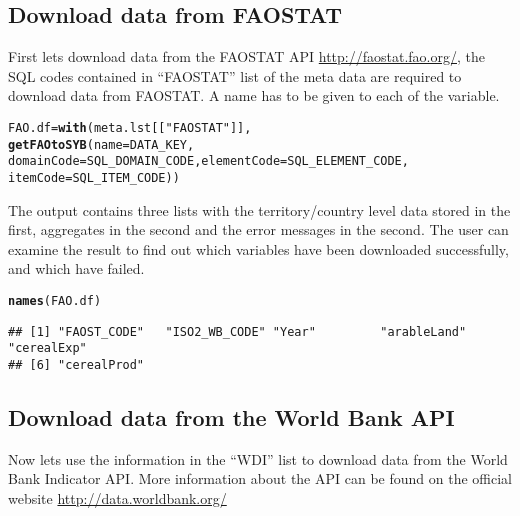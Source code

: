 \documentclass{article}\usepackage{graphicx, color}
\makeatletter
\newcommand{\hlfunctioncall}[1]{\textcolor[rgb]{0.501960784313725,0,0.329411764705882}{\textbf{#1}}}%
\newcommand{\hlstring}[1]{\textcolor[rgb]{0.6,0.6,1}{#1}}%
\newenvironment{kframe}{%
 \def\at@end@of@kframe{}%
 \ifinner\ifhmode%
  \def\at@end@of@kframe{\end{minipage}}%
  \begin{minipage}{\columnwidth}%
 \fi\fi%
 \def\FrameCommand##1{\hskip\@totalleftmargin \hskip-\fboxsep
 \colorbox{shadecolor}{##1}\hskip-\fboxsep
     \hskip-\linewidth \hskip-\@totalleftmargin \hskip\columnwidth}%
 \MakeFramed {\advance\hsize-\width
   \@totalleftmargin\z@ \linewidth\hsize
   \@setminipage}}%
 {\par\unskip\endMakeFramed%
 \at@end@of@kframe}
\newenvironment{knitrout}{}{} %
\makeatother
\begin{document}
\subsection{Download data from FAOSTAT}
First lets download data from the FAOSTAT API
\url{http://faostat.fao.org/}, the SQL codes contained in ``FAOSTAT''
list of the meta data are required to download data from FAOSTAT. A name
has to be given to each of the variable.

\begin{knitrout}
\color{fgcolor}\begin{kframe}
\begin{alltt}
FAO.df = \hlfunctioncall{with}(meta.lst[[\hlstring{"FAOSTAT"}]],
    \hlfunctioncall{getFAOtoSYB}(name = DATA_KEY,
                domainCode = SQL_DOMAIN_CODE, elementCode = SQL_ELEMENT_CODE,
                itemCode = SQL_ITEM_CODE))
\end{alltt}
\end{kframe}
\end{knitrout}


The output contains three lists with the territory/country level data
stored in the first, aggregates in the second and the error messages in
the second. The user can examine the result to find out which variables
have been downloaded successfully, and which have failed.

\begin{knitrout}
\color{fgcolor}\begin{kframe}
\begin{alltt}
\hlfunctioncall{names}(FAO.df)
\end{alltt}
\begin{verbatim}
## [1] "FAOST_CODE"   "ISO2_WB_CODE" "Year"         "arableLand"   "cerealExp"   
## [6] "cerealProd"
\end{verbatim}
\end{kframe}
\end{knitrout}











\subsection{Download data from the World Bank API}
Now lets use the information in the ``WDI'' list to download data from
the World Bank Indicator API. More information about the API can be
found on the official website \url{http://data.worldbank.org/}
\end{document}
